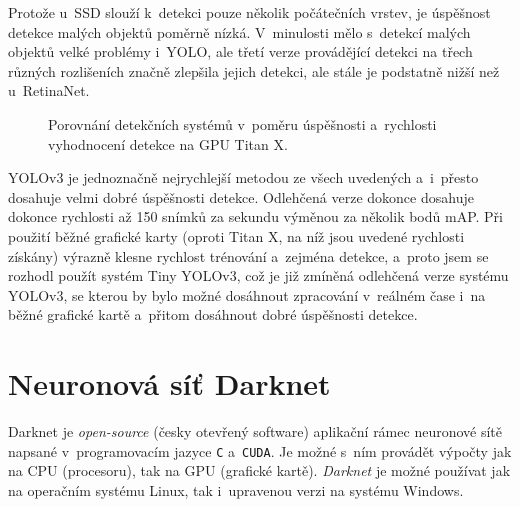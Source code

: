 Protože u~SSD slouží k~detekci pouze několik počátečních vrstev, je úspěšnost detekce malých objektů poměrně nízká. V~minulosti mělo s~detekcí malých objektů velké problémy i~YOLO, ale třetí verze provádějící detekci na třech různých rozlišeních značně zlepšila jejich detekci, ale stále je podstatně nižší než u~RetinaNet.

\begin{figure}[H]
    \centering
    \caption{Porovnání detekčních systémů v~poměru úspěšnosti a~rychlosti vyhodnocení detekce na GPU Titan X.\footnotemark}
    \label{fig:porovnaniDetektoru}
\end{figure}


YOLOv3 je jednoznačně nejrychlejší metodou ze všech uvedených a~i~přesto dosahuje velmi dobré úspěšnosti detekce. Odlehčená verze dokonce dosahuje dokonce rychlosti až 150 snímků za sekundu výměnou za několik bodů mAP. Při použití běžné grafické karty (oproti Titan X, na níž jsou uvedené rychlosti získány) výrazně klesne rychlost trénování a~zejména detekce, a~proto jsem se rozhodl použít systém Tiny YOLOv3, což je již zmíněná odlehčená verze systému YOLOv3, se kterou by bylo možné dosáhnout zpracování v~reálném čase i~na běžné grafické kartě a~přitom dosáhnout dobré úspěšnosti detekce.




\section{Neuronová síť Darknet}
\label{navrhDarknet}
Darknet \cite{darknet} je \emph{open-source} (česky otevřený software) aplikační rámec neuronové sítě napsané v~programovacím jazyce \texttt{C} a~\texttt{CUDA}\footnotemark. Je možné s~ním provádět výpočty jak na CPU (procesoru), tak na GPU (grafické kartě). \emph{Darknet} je možné používat jak na operačním systému Linux, tak i~upravenou verzi na systému Windows.

